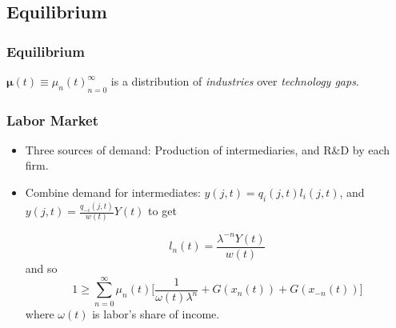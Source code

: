 \documentclass{beamer}
\begin{document}



\subsection{Equilibrium}
\label{sub:equilibrium}
\begin{frame}[t]\frametitle{Equilibrium} 

  $\bm{\mu}(t) \equiv {\mu_n(t)}_{n=0}^\infty$ is a distribution of \emph{industries} over \emph{technology gaps}.
  

\end{frame}

\begin{frame}[t]\frametitle{Labor Market} 
  \begin{itemize}
    \item<+-> Three sources of demand: Production of intermediaries, and R\&D by each firm.
    \item<+-> Combine demand for intermediates: $y(j, t) = q_i(j, t)l_i(j, t)$, and $y(j, t) = \frac{q_{-i}(j, t)}{w(t)}Y(t)$ to get

      \begin{equation}
        l_n(t) = \frac{\lambda^{-n}Y(t)}{w(t)}
      \end{equation}
    and so
      \begin{equation} \label{eq:labor_clearing}
        1 \geq \sum_{n=0}^{\infty} \mu_n(t) \Big[\frac{1}{\omega(t)\lambda^n} + G(x_n(t))    + G(x_{-n}(t))\Big]
      \end{equation}
      where $\omega(t)$ is labor's share of income.

  \end{itemize}
\end{frame}
\end{document}
